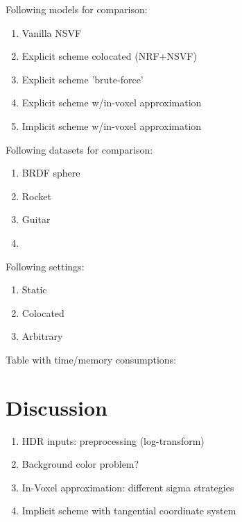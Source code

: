 Following models for comparison:
\begin{enumerate}
    \item Vanilla NSVF
    \item Explicit scheme colocated (NRF+NSVF)
    \item Explicit scheme 'brute-force'
    \item Explicit scheme w/in-voxel approximation
    \item Implicit scheme w/in-voxel approximation
\end{enumerate}


Following datasets for comparison:
\begin{enumerate}
    \item BRDF sphere
    \item Rocket
    \item Guitar
    \item \color{orange}{Trophy/donut/tablelamp}
\end{enumerate}

Following settings:
\begin{enumerate}
    \item Static
    \item Colocated
    \item Arbitrary
\end{enumerate}


Table with time/memory consumptions:



\section{Discussion}

\begin{enumerate}
    \item HDR inputs: preprocessing (log-transform)
    \item Background color problem?
    \item In-Voxel approximation: different sigma strategies
    \item Implicit scheme with tangential coordinate system
\end{enumerate}






